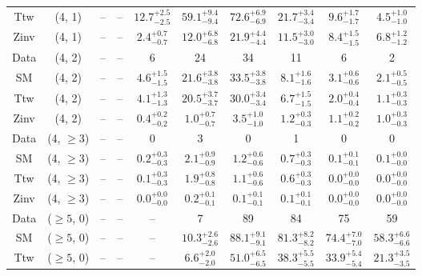 \begin{table}[h!]
{\begin{tabular}{cccccccccc}
	Ttw & (4, 1) & -- & -- & $12.7^{+ 2.5 }_{- 2.5 }$ & $59.1^{+ 9.4 }_{- 9.4 }$ & $72.6^{+ 6.9 }_{- 6.9 }$ & $21.7^{+ 3.4 }_{- 3.4 }$ & $9.6^{+ 1.7 }_{- 1.7 }$ & $4.5^{+ 1.0 }_{- 1.0 }$ \\[0.5ex] 
	Zinv & (4, 1) & -- & -- & $2.4^{+ 0.7 }_{- 0.7 }$ & $12.0^{+ 6.8 }_{- 6.8 }$ & $21.9^{+ 4.4 }_{- 4.4 }$ & $11.5^{+ 3.0 }_{- 3.0 }$ & $8.4^{+ 1.5 }_{- 1.5 }$ & $6.8^{+ 1.2 }_{- 1.2 }$ \\[0.5ex] 
	Data & (4, 2) & -- & -- & 6 & 24 & 34 & 11 & 6 & 2 \\[0.5ex] 
	SM & (4, 2) & -- & -- & $4.6^{+ 1.5 }_{- 1.5 }$ & $21.6^{+ 3.8 }_{- 3.8 }$ & $33.5^{+ 3.8 }_{- 3.8 }$ & $8.1^{+ 1.6 }_{- 1.6 }$ & $3.1^{+ 0.6 }_{- 0.6 }$ & $2.1^{+ 0.5 }_{- 0.5 }$ \\[0.5ex] 
	Ttw & (4, 2) & -- & -- & $4.1^{+ 1.3 }_{- 1.3 }$ & $20.5^{+ 3.7 }_{- 3.7 }$ & $30.0^{+ 3.4 }_{- 3.4 }$ & $6.7^{+ 1.5 }_{- 1.5 }$ & $2.0^{+ 0.4 }_{- 0.4 }$ & $1.1^{+ 0.3 }_{- 0.3 }$ \\[0.5ex] 
	Zinv & (4, 2) & -- & -- & $0.4^{+ 0.2 }_{- 0.2 }$ & $1.0^{+ 0.7 }_{- 0.7 }$ & $3.5^{+ 1.0 }_{- 1.0 }$ & $1.2^{+ 0.3 }_{- 0.3 }$ & $1.1^{+ 0.2 }_{- 0.2 }$ & $1.0^{+ 0.3 }_{- 0.3 }$ \\[0.5ex] 
	Data & (4, $\ge3$) & -- & -- & 0 & 3 & 0 & 1 & 0 & 0 \\[0.5ex] 
	SM & (4, $\ge3$) & -- & -- & $0.2^{+ 0.3 }_{- 0.3 }$ & $2.1^{+ 0.9 }_{- 0.9 }$ & $1.2^{+ 0.6 }_{- 0.6 }$ & $0.7^{+ 0.3 }_{- 0.3 }$ & $0.1^{+ 0.1 }_{- 0.1 }$ & $0.1^{+ 0.0 }_{- 0.0 }$ \\[0.5ex] 
	Ttw & (4, $\ge3$) & -- & -- & $0.1^{+ 0.3 }_{- 0.3 }$ & $1.9^{+ 0.8 }_{- 0.8 }$ & $1.1^{+ 0.6 }_{- 0.6 }$ & $0.6^{+ 0.3 }_{- 0.3 }$ & $0.0^{+ 0.0 }_{- 0.0 }$ & $0.0^{+ 0.0 }_{- 0.0 }$ \\[0.5ex] 
	Zinv & (4, $\ge3$) & -- & -- & $0.0^{+ 0.0 }_{- 0.0 }$ & $0.2^{+ 0.1 }_{- 0.1 }$ & $0.1^{+ 0.1 }_{- 0.1 }$ & $0.1^{+ 0.1 }_{- 0.1 }$ & $0.0^{+ 0.0 }_{- 0.0 }$ & $0.0^{+ 0.0 }_{- 0.0 }$ \\[0.5ex] 
	Data & ($\ge5$, 0) & -- & -- & -- & 7 & 89 & 84 & 75 & 59 \\[0.5ex] 
	SM & ($\ge5$, 0) & -- & -- & -- & $10.3^{+ 2.6 }_{- 2.6 }$ & $88.1^{+ 9.1 }_{- 9.1 }$ & $81.3^{+ 8.2 }_{- 8.2 }$ & $74.4^{+ 7.0 }_{- 7.0 }$ & $58.3^{+ 6.6 }_{- 6.6 }$ \\[0.5ex] 
	Ttw & ($\ge5$, 0) & -- & -- & -- & $6.6^{+ 2.0 }_{- 2.0 }$ & $51.0^{+ 6.5 }_{- 6.5 }$ & $38.3^{+ 5.5 }_{- 5.5 }$ & $33.9^{+ 5.4 }_{- 5.4 }$ & $21.3^{+ 3.5 }_{- 3.5 }$ \\[0.5ex] 

\end{tabular}}
\end{table}
